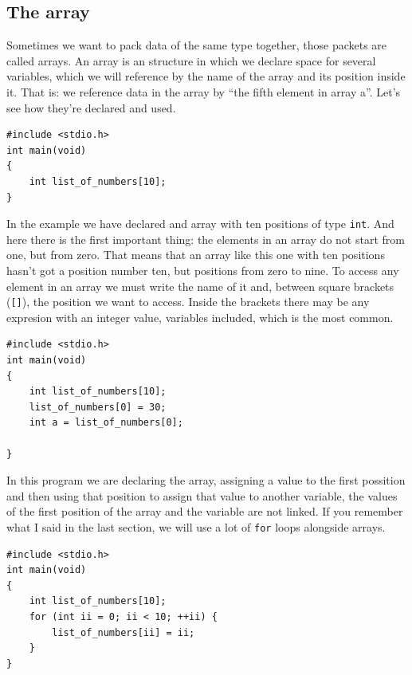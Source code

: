 \documentclass[a4paper]{article}
\begin{document}
\subsection{The array}
Sometimes we want to pack data of the same type together, those packets are
called arrays. An array is an structure in which we declare space for several
variables, which we will reference by the name of the array and its position
inside it. That is: we reference data in the array by ``the fifth element in
array a''. Let's see how they're declared and used.

\noindent
\begin{minipage}[H]{\linewidth}
\mbox{}
\begin{lstlisting}[style=C,
caption={Example of declaration of an array},
label={lst:arrayDeclaration}]
#include <stdio.h>
int main(void)
{
    int list_of_numbers[10];
}
\end{lstlisting}
\end{minipage}

In the example we have declared and array with ten positions of type
\texttt{int}. And here there is the first important thing: the elements in an
array do not start from one, but from zero. That means that an array like this
one with ten positions hasn't got a position number ten, but positions from
zero to nine.
To access any element in an array we must write the name of it and, between
square brackets (\verb![]!), the position we want to access. Inside the brackets
there may be any expresion with an integer value, variables included, which
is the most common.

\noindent
\begin{minipage}[H]{\linewidth}
\mbox{}
\begin{lstlisting}[style=C,
caption={Example of ussage of an array},
label={lst:arrayUse}]
#include <stdio.h>
int main(void)
{
    int list_of_numbers[10];
    list_of_numbers[0] = 30;
    int a = list_of_numbers[0];

}
\end{lstlisting}
\end{minipage}

In this program we are declaring the array, assigning a value to the first
possition and then using that position to assign that value to another
variable, the values of the first position of the array and the variable
are not linked. If you remember what I said in the last section, we will
use a lot of \texttt{for} loops alongside arrays.

\noindent
\begin{minipage}[H]{\linewidth}
\mbox{}
\begin{lstlisting}[style=C,
caption={Example of how to use an array},
label={lst:arrayIteration}]
#include <stdio.h>
int main(void)
{
    int list_of_numbers[10];
    for (int ii = 0; ii < 10; ++ii) {
        list_of_numbers[ii] = ii;
    }
}
\end{lstlisting}
\end{minipage}
\end{document}
